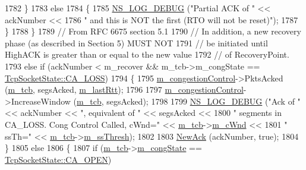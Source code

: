 \begin{DoxyCode}
1782             \}
1783           \textcolor{keywordflow}{else}
1784             \{
1785               \hyperlink{group__logging_ga413f1886406d49f59a6a0a89b77b4d0a}{NS\_LOG\_DEBUG} (\textcolor{stringliteral}{"Partial ACK of "} << ackNumber <<
1786                             \textcolor{stringliteral}{" and this is NOT the first (RTO will not be reset)"});
1787             \}
1788         \}
1789       \textcolor{comment}{// From RFC 6675 section 5.1}
1790       \textcolor{comment}{// In addition, a new recovery phase (as described in Section 5) MUST NOT}
1791       \textcolor{comment}{// be initiated until HighACK is greater than or equal to the new value}
1792       \textcolor{comment}{// of RecoveryPoint.}
1793       \textcolor{keywordflow}{else} \textcolor{keywordflow}{if} (ackNumber < m\_recover && m\_tcb->m\_congState == 
      \hyperlink{classns3_1_1TcpSocketState_a6fc313945a33d48fd60cbffe0c787b19ad50c191d2648f5472641d8e144ccbf3d}{TcpSocketState::CA\_LOSS})
1794         \{
1795           \hyperlink{classns3_1_1TcpSocketBase_a090719d52b06a791341e2fefa5e12c3e}{m\_congestionControl}->PktsAcked (\hyperlink{classns3_1_1TcpSocketBase_a26bbaf59001308dc43fb630d76f2e38b}{m\_tcb}, segsAcked, 
      \hyperlink{classns3_1_1TcpSocketBase_a6c48fbea019c593b975bd1d5f5c95dde}{m\_lastRtt});
1796 
1797           \hyperlink{classns3_1_1TcpSocketBase_a090719d52b06a791341e2fefa5e12c3e}{m\_congestionControl}->IncreaseWindow (\hyperlink{classns3_1_1TcpSocketBase_a26bbaf59001308dc43fb630d76f2e38b}{m\_tcb}, segsAcked);
1798 
1799           \hyperlink{group__logging_ga413f1886406d49f59a6a0a89b77b4d0a}{NS\_LOG\_DEBUG} (\textcolor{stringliteral}{"Ack of "} << ackNumber << \textcolor{stringliteral}{", equivalent of "} << segsAcked <<
1800                         \textcolor{stringliteral}{" segments in CA\_LOSS. Cong Control Called, cWnd="} << 
      \hyperlink{classns3_1_1TcpSocketBase_a26bbaf59001308dc43fb630d76f2e38b}{m\_tcb}->\hyperlink{classns3_1_1TcpSocketState_a7cd3d2156a483c1db436097477a0fd7f}{m\_cWnd} <<
1801                         \textcolor{stringliteral}{" ssTh="} << \hyperlink{classns3_1_1TcpSocketBase_a26bbaf59001308dc43fb630d76f2e38b}{m\_tcb}->\hyperlink{classns3_1_1TcpSocketState_aec003b6dba9d269bfb1036c7652ffbd6}{m\_ssThresh});
1802 
1803           \hyperlink{classns3_1_1TcpSocketBase_a13401dd51854607d0521a35bf2622761}{NewAck} (ackNumber, \textcolor{keyword}{true});
1804         \}
1805       \textcolor{keywordflow}{else}
1806         \{
1807           \textcolor{keywordflow}{if} (\hyperlink{classns3_1_1TcpSocketBase_a26bbaf59001308dc43fb630d76f2e38b}{m\_tcb}->\hyperlink{classns3_1_1TcpSocketState_a4053e1eb120c572d0881b04620b52c30}{m\_congState} == \hyperlink{classns3_1_1TcpSocketState_a6fc313945a33d48fd60cbffe0c787b19af2d22f02a77b603394c34d4968bad142}{TcpSocketState::CA\_OPEN})

\end{DoxyCode}
